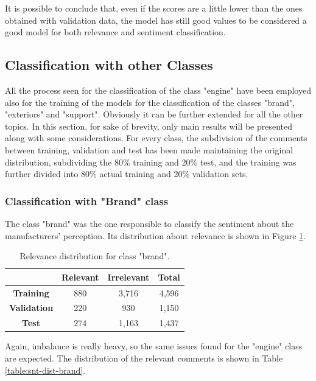 It is possible to conclude that, even if the scores are a little lower than the ones obtained with validation data, the model has still good values to be considered a good model for both relevance and sentiment classification.


\subsection{Classification with other Classes}

All the process seen for the classification of the class "engine" have been employed also for the training of the models for the classification of the classes "brand", "exteriors" and "support". Obviously it can be further extended for all the other topics. In this section, for sake of brevity, only main results will be presented along with some considerations. For every class, the subdivision of the comments between training, validation and test has been made maintaining the original distribution, subdividing the 80\% training and 20\% test, and the training was further divided into 80\% actual training and 20\% validation sets.

\subsubsection{Classification with "Brand" class}

The class "brand" was the one responsible to classify the sentiment about the manufacturers' perception. Its distribution about relevance is shown in Figure \ref{table:rel-dist-brand}.

\begin{table}[H]
	\centering
	\begin{tabular}{ | c  c  c | c | } 
		\hline
		& \textbf{Relevant} & \textbf{Irrelevant} & \textbf{Total} \\
		\hline
		\textbf{Training} & 880 & 3,716 & 4,596 \\ 
		\hline
		\textbf{Validation} & 220 & 930 & 1,150 \\ 
		\hline
		\textbf{Test} & 274 & 1,163 & 1,437 \\
		\hline
	\end{tabular}
	\caption{Relevance distribution for class "brand".}
	\label{table:rel-dist-brand}
\end{table}

Again, imbalance is really heavy, so the same issues found for the "engine" class are expected. The distribution of the relevant comments is shown in Table \ref{table:snt-dist-brand}.

